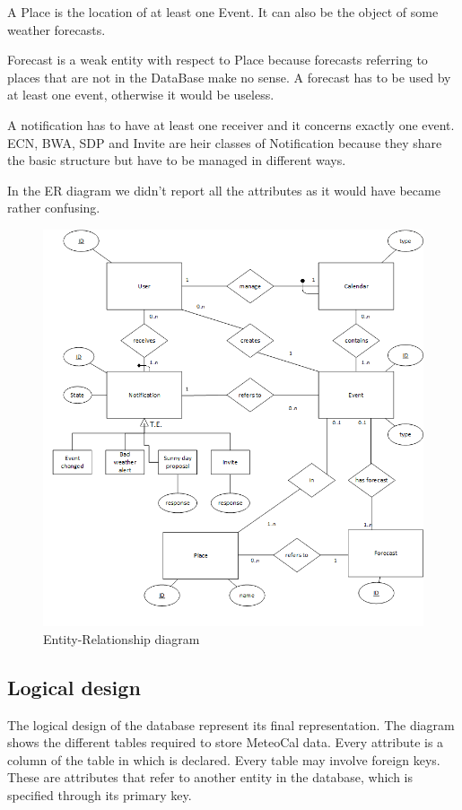 \documentclass[10pt,a4paper,titlepage]{article}
\begin{document}
A Place is the location of at least one Event. It can also be the object of some weather forecasts.

Forecast is a weak entity with respect to Place because forecasts referring to places that are not in the DataBase make no sense. A forecast has to be used by at least one event, otherwise it would be useless.

A notification has to have at least one receiver and it concerns exactly one event. ECN, BWA, SDP and Invite are heir classes of Notification because they share the basic structure but have to be managed in different ways.

\vspace{1em}
In the ER diagram we didn't report all the attributes as it would have became rather confusing.

\begin{figure}[p]
\centering
\includegraphics[width=\linewidth]{./images/ER}
\caption[ER]{Entity-Relationship diagram}
\label{fig:ER}
\end{figure}

\clearpage
\subsection{Logical design}
The logical design of the database represent its final representation. The diagram shows the different tables required to store MeteoCal data. Every attribute is a column of the table in which is declared. Every table may involve foreign keys. These are attributes that refer to another entity in the database, which is specified through its primary key. 
\end{document}
